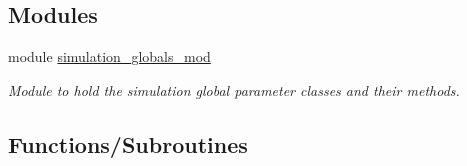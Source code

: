 \subsection*{Modules}
\begin{DoxyCompactItemize}
\item 
module \mbox{\hyperlink{namespacesimulation__globals__mod}{simulation\+\_\+globals\+\_\+mod}}
\begin{DoxyCompactList}\small\item\em Module to hold the simulation global parameter classes and their methods. \end{DoxyCompactList}\end{DoxyCompactItemize}
\subsection*{Functions/\+Subroutines}
